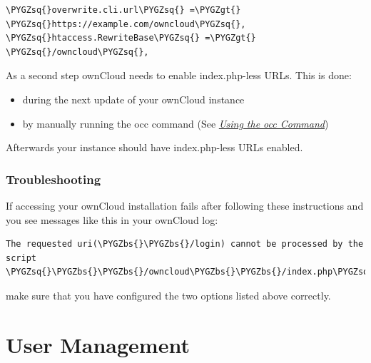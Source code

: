\documentclass[letterpaper,10pt,english]{sphinxmanual}
\def\PYGZbs{\char`\\}
\def\PYGZgt{\char`\>}
\def\PYGZsq{\char`\'}
\begin{document}
\begin{Verbatim}[commandchars=\\\{\}]
\PYGZsq{}overwrite.cli.url\PYGZsq{} =\PYGZgt{} \PYGZsq{}https://example.com/owncloud\PYGZsq{},
\PYGZsq{}htaccess.RewriteBase\PYGZsq{} =\PYGZgt{} \PYGZsq{}/owncloud\PYGZsq{},
\end{Verbatim}

As a second step ownCloud needs to enable index.php-less URLs. This is done:
\begin{itemize}
\item {} 
during the next update of your ownCloud instance

\item {} 
by manually running the occ command  (See {\hyperref[configuration_server/occ_command::doc]{\emph{Using the occ Command}}})

\end{itemize}

Afterwards your instance should have index.php-less URLs enabled.


\subsection{Troubleshooting}
\label{configuration_server/index_php_less_urls:troubleshooting}
If accessing your ownCloud installation fails after following these instructions and you see
messages like this in your ownCloud log:

\begin{Verbatim}[commandchars=\\\{\}]
The requested uri(\PYGZbs{}\PYGZbs{}/login) cannot be processed by the script \PYGZsq{}\PYGZbs{}\PYGZbs{}/owncloud\PYGZbs{}\PYGZbs{}/index.php\PYGZsq{}
\end{Verbatim}

make sure that you have configured the two  options listed above correctly.


\chapter{User Management}
\label{configuration_user/index:user-management}\label{configuration_user/index::doc}
\end{document}
